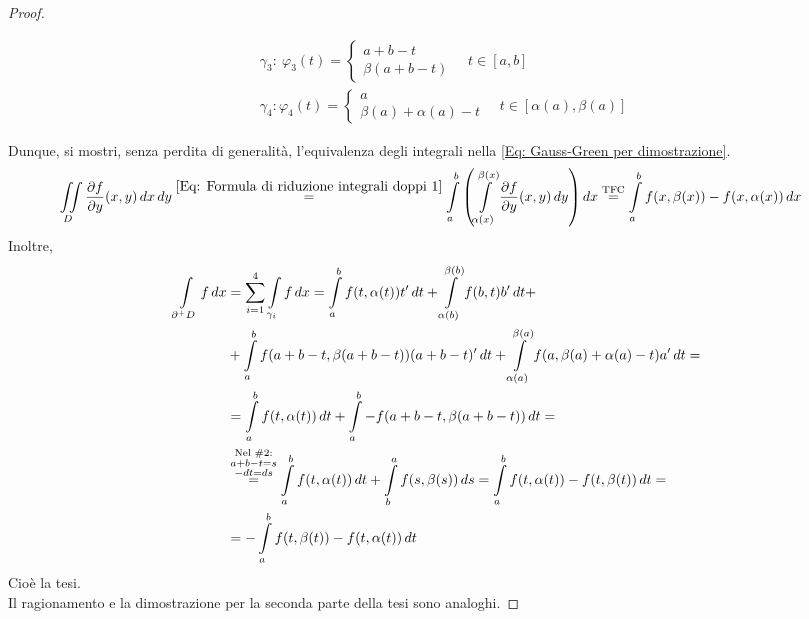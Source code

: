 \begin{proof}
\begin{figure}[H]
\begin{minipage}{0.63\textwidth}
\begin{equation}
\begin{aligned}
                &\gamma_3:\ \varphi_3(t)= \begin{cases}
                    a+b-t\\
                    \beta(a+b-t)
                \end{cases}
                \quad t \in [a,b]\\
                &\gamma_4: \varphi_4(t)= \begin{cases}
                    a\\
                    \beta(a)+\alpha(a)-t
                \end{cases}
                \quad t \in [\alpha(a), \beta(a)]
            \end{aligned}
        \end{equation}
     \end{minipage}
 \end{figure}
 \flushleft Dunque, si mostri, senza perdita di generalità, l'equivalenza degli integrali nella \eqref{Eq: Gauss-Green per dimostrazione}.
 \begin{equation}
    \begin{aligned}
     \iint\limits_D{\frac{\partial f}{\partial y}(x,y)}\,dx\,dy &\overset{\eqref{Eq: Formula di riduzione integrali doppi 1}}{=} \int\limits_{a}^{b}{\left( \int\limits_{\alpha(x)}^{\beta(x)}\frac{\partial f}{\partial y}(x,y)\,dy \right)}\, dx \overset{\text{TFC}}{=}\int\limits_{a}^{b}{ f(x, \beta(x))- f(x, \alpha(x))}\, dx
     \end{aligned}
 \end{equation}
Inoltre, 
\begin{equation}
\begin{aligned}
    \int\limits_{\partial^+ D}{f}\, dx &= \sum\limits_{i=1}^{4} \int\limits_{\gamma_i}{f}\,dx =
    \int\limits_{a}^{b}{f(t, \alpha(t)) t'}\, dt+ \int\limits_{\alpha(b)}^{\beta(b)}{f(b,t)b'}\, dt +\\
    &+\int\limits_{a}^{b}{f(a+b-t, \beta(a+b-t))(a+b-t)'}\, dt + \int\limits_{\alpha(a)}^{\beta(a)}{f(a, \beta(a)+\alpha(a)-t) a'}\, dt=\\
    &= \int\limits_{a}^{b}{f(t, \alpha(t))}\, dt + \int\limits_{a}^{b}{-f(a+b-t, \beta(a+b-t))}\, dt =\\
    &\overset{\substack{\text{Nel }\#2:\\ a+b-t=s\\ -dt=ds}}{=} \int\limits_a^b{f(t, \alpha(t))}\, dt + \int\limits_b^a{f(s, \beta(s))}\, ds = \int\limits_{a}^{b}{f(t, \alpha(t))- f(t, \beta(t))}\, dt=\\
    &=-\int\limits_{a}^{b}{ f(t, \beta(t))- f(t, \alpha(t))}\, dt
    \end{aligned}
\end{equation}
Cioè la tesi.\\
Il ragionamento e la dimostrazione per la seconda parte della tesi sono analoghi.
 \end{proof}
